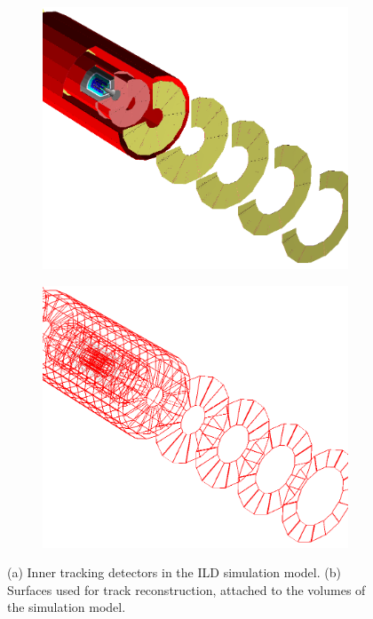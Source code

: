 \begin{figure}[h!]
\centering
\begin{subfigure}{0.48\textwidth}
\includegraphics[width=1\hsize]{Modelling/fig/ild_inner_trackers.png} 
\caption{}
\end{subfigure}
\begin{subfigure}{0.48\textwidth}
\includegraphics[width=1\hsize]{Modelling/fig/ild_inner_trackers_surfaces.png}
\caption{}
\end{subfigure}
\caption{\label{fig:inner_trk_surfaces} (a) Inner tracking detectors in the ILD simulation model.
  (b) Surfaces used for track reconstruction, attached to the volumes of the simulation model.}
\end{figure}

